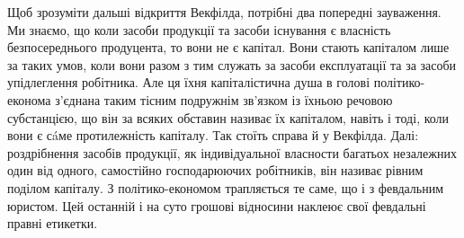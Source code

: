 

Щоб зрозуміти дальші відкриття Векфілда, потрібні два попередні зауваження. Ми знаємо, що коли
засоби продукції та засоби існування є власність безпосереднього продуцента, то вони не є капітал.
Вони стають капіталом лише за таких умов, коли вони разом з тим служать за засоби експлуатації та за
засоби упідлеглення робітника. Але ця їхня капіталістична душа в голові політико-економа з’єднана
таким тісним подружнім зв’язком із їхньою речовою субстанцією, що він за всяких обставин називає їх
капіталом, навіть і тоді, коли вони є сáме протилежність капіталу. Так стоїть справа й у Векфілда.
Далі: роздрібнення засобів продукції, як індивідуальної власности багатьох незалежних один від
одного, самостійно господарюючих робітників, він називає рівним поділом капіталу. З
політико-економом трапляється те саме, що і з февдальним юристом. Цей останній і на суто грошові
відносини наклеює свої февдальні правні етикетки.


